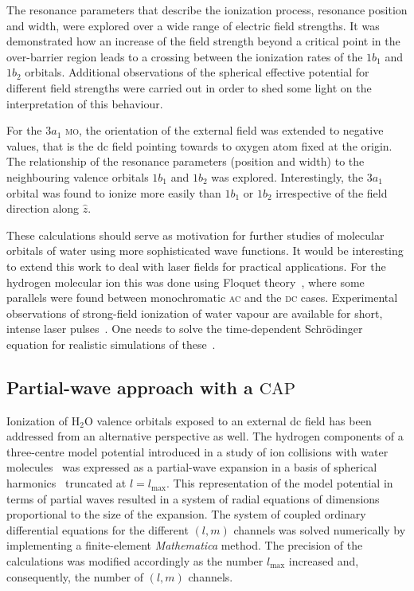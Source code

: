 The resonance parameters that describe the ionization process,
resonance position and width, were explored over a wide range of
electric field strengths. It was demonstrated how an increase of the
field strength beyond a critical point in the over-barrier region
leads to a crossing between the ionization rates of the $1b_{1}$ and
$1b_{2}$ orbitals. Additional observations of the spherical effective
potential for different field strengths were carried out in order to
shed some light on the interpretation of this behaviour.

For the $3a_{1}$ \textsc{mo}, the orientation of the external field
was extended to negative values, that is the dc field pointing towards
to oxygen atom fixed at the origin. The relationship of the resonance
parameters (position and width) to the neighbouring valence orbitals
$1b_{1}$ and $1b_{2}$ was explored. Interestingly, the $3a_{1}$
orbital was found to ionize more easily than $1b_{1}$ or $1b_{2}$
irrespective of the field direction along $\hat{z}$.

These calculations should serve as motivation for further studies of
molecular orbitals of water using more sophisticated wave
functions. It would be interesting to extend this work to deal with
laser fields for practical applications. For the hydrogen molecular
ion this was done using Floquet theory~\cite{Tsog_H2mol_ac_2013},
where some parallels were found between monochromatic \textsc{ac} and
the \textsc{dc} cases. Experimental observations of strong-field
ionization of water vapour are available for short, intense laser
pulses~\cite{exp_h2o_laser_2008,exp_h2o_laser_2014}. One needs to
solve the time-dependent Schr\"{o}dinger equation for realistic
simulations of these~\cite{Farrell_2011,Falge_2010}.


\subsection*{Partial-wave approach with a $\mathrm{CAP}$}

Ionization of H$_{2}$O valence orbitals exposed to an external dc
field has been addressed from an alternative perspective as well. The
hydrogen components of a three-centre model potential introduced in a
study of ion collisions with water
molecules~\cite{illescas_modelV_2011} was expressed as a partial-wave
expansion in a basis of spherical harmonics~\cite{marko_partialwave}
truncated at $l = l_{\mathrm{max}}$. This representation of the model
potential in terms of partial waves resulted in a system of radial
equations of dimensions proportional to the size of the expansion. The
system of coupled ordinary differential equations for the different
$(l,m)$ channels was solved numerically by implementing a
finite-element \emph{Mathematica} method. The precision of the
calculations was modified accordingly as the number $l_{\mathrm{max}}$
increased and, consequently, the number of $(l,m)$ channels.

